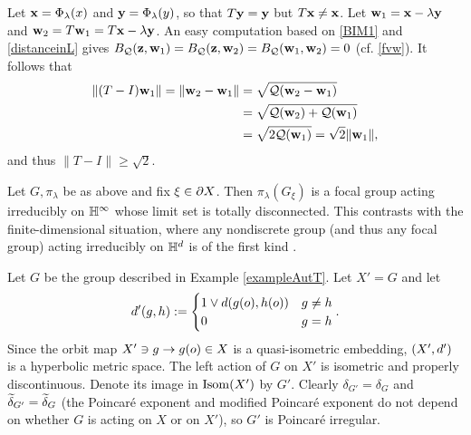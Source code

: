 \begin{example}
Let $\mathbf x = \Phi_\lambda(x)$ and $\mathbf y = \Phi_\lambda(y)$, so that $T\mathbf y = \mathbf y$ but $T\mathbf x\neq \mathbf x$. Let $\mathbf w_1 = \mathbf x - \lambda \mathbf y$ and $\mathbf w_2 = T\mathbf w_1 = T\mathbf x - \lambda\mathbf y$. An easy computation based on \eqref{BIM1} and \eqref{distanceinL} gives $B_\mathcal Q(\mathbf z,\mathbf w_1) = B_\mathcal Q(\mathbf z,\mathbf w_2) = B_\mathcal Q(\mathbf w_1,\mathbf w_2) = 0$ (cf. \eqref{fvw}). It follows that
\begin{align*}
\|(T - I)\mathbf w_1\| = \|\mathbf w_2 - \mathbf w_1\| &= \sqrt{\mathcal Q(\mathbf w_2 - \mathbf w_1)}\\ 
&= \sqrt{\mathcal Q(\mathbf w_2) + \mathcal Q(\mathbf w_1)}\\ 
&= \sqrt{2\mathcal Q(\mathbf w_1)} = \sqrt 2 \|\mathbf w_1\|,
\end{align*}
and thus $\|T - I\| \geq \sqrt 2$.
\end{example}

\begin{remark}
\label{remarkfocalfractal}
Let $G,\pi_\lambda$ be as above and fix $\xi\in \partial X$. Then $\pi_\lambda(G_\xi)$ is a focal group acting irreducibly on $\H^\infty$ whose limit set is totally disconnected. This contrasts with the finite-dimensional situation, where any nondiscrete group (and thus any focal group) acting irreducibly on $\H^d$ is of the first kind \cite[Theorem 2]{Greenberg}.
\end{remark}



\begin{example}
\label{exampleAutTparttwo}
Let $G$ be the group described in Example \ref{exampleAutT}. Let $X' = G$ and let
\[
d'(g,h) := \begin{cases}
1\vee d(g(o),h(o)) & g\neq h\\
0 & g = h
\end{cases}.
\]
Since the orbit map $X'\ni g\to g(o)\in X$ is a quasi-isometric embedding, $(X',d')$ is a hyperbolic metric space. The left action of $G$ on $X'$ is isometric and properly discontinuous. Denote its image in $\operatorname{Isom}(X')$ by $G'$. Clearly $\delta_{G'} = \delta_G$ and $\widetilde\delta_{G'} = \widetilde\delta_G$ (the Poincar\'e exponent and modified Poincar\'e exponent do not depend on whether $G$ is acting on $X$ or on $X'$), so $G'$ is Poincar\'e irregular.
\end{example}

